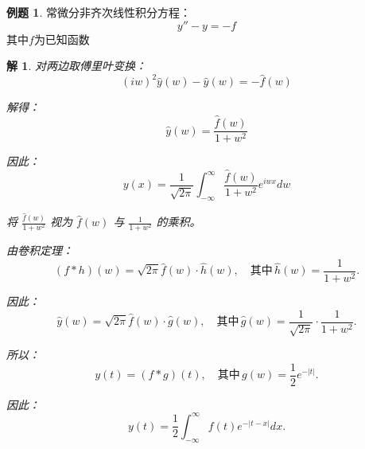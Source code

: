 \documentclass[12pt,a4paper]{article}
\numberwithin{subsection}{section}   %
\numberwithin{subsubsection}{subsection}
\theoremstyle{plain}
\newtheorem{solution}{解}[subsection]  %
\theoremstyle{definition}
\newtheorem{example}{例题}[subsection]  %
\theoremstyle{remark}
\theoremstyle{remark}
\begin{document}
\begin{example}
	常微分非齐次线性积分方程：
	\begin{equation}
		y'' - y = -f
	\end{equation}
 其中$  f$为已知函数
	 
	\begin{solution}
		对两边取傅里叶变换：
		\begin{equation}
			(iw)^2 \hat{y}(w) - \hat{y}(w) = -\hat{f}(w)
		\end{equation}
		
		解得：
		\begin{equation}
			\hat{y}(w) = \frac{\hat{f}(w)}{1 + w^2}
		\end{equation}
		
		因此：
		\begin{equation}
			y(x) = \frac{1}{\sqrt{2\pi}} \int_{-\infty}^{\infty} \frac{\hat{f}(w)}{1 + w^2} e^{iwx} dw
		\end{equation}
		
		将 \(\frac{\hat{f}(w)}{1 + w^2}\) 视为 \(\hat{f}(w)\) 与 \(\frac{1}{1 + w^2}\) 的乘积。
		
		由卷积定理：
		\begin{equation}
			(f * h)(w) = \sqrt{2\pi} \hat{f}(w) \cdot \hat{h}(w), \quad \text{其中} \, \hat{h}(w) = \frac{1}{1 + w^2}.
		\end{equation}
		
		因此：
		\begin{equation}
			\hat{y}(w) = \sqrt{2\pi} \hat{f}(w) \cdot \hat{g}(w), \quad \text{其中} \, \hat{g}(w) = \frac{1}{\sqrt{2\pi}} \cdot \frac{1}{1 + w^2}.
		\end{equation}
		
		所以：
		\begin{equation}
			y(t) = (f * g)(t), \quad \text{其中} \, g(w) = \frac{1}{2} e^{-|t|}.
		\end{equation}
		
		因此：
		\begin{equation}
			y(t) = \frac{1}{2} \int_{-\infty}^{\infty} f(t) e^{-|t - x|} dx.
		\end{equation}
		
	\end{solution}
\end{example}
\end{document}
